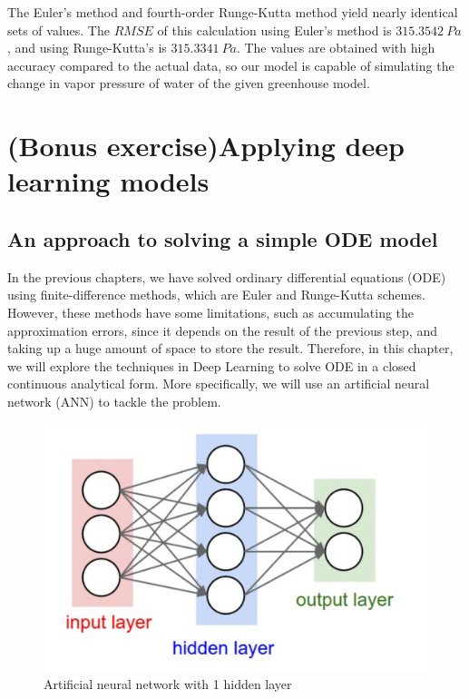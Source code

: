 \documentclass[a4paper]{article}
\numberwithin{equation}{section}
\begin{document}
The Euler's method and fourth-order Runge-Kutta method yield nearly identical sets of values. The \(RMSE\) of this calculation using Euler's method is \(315.3542\ Pa\), and using Runge-Kutta's is \(315.3341\ Pa\). The values are obtained with high accuracy compared to the actual data, so our model is capable of simulating the change in vapor pressure of water of the given greenhouse model.

\newpage
\section{(Bonus exercise)Applying deep learning models}
\subsection{An approach to solving a simple ODE model}
In the previous chapters, we have solved ordinary differential equations (ODE) using finite-difference methods, which are Euler and Runge-Kutta schemes. However, these methods have some limitations, such as accumulating the approximation errors, since it depends on the result of the previous step, and taking up a huge amount of space to store the result. Therefore, in this chapter, we will explore the techniques in Deep Learning to solve ODE in a closed continuous analytical form. More specifically, we will use an artificial neural network (ANN) to tackle the problem.

\begin{figure}[H]
  \centering
  \includegraphics[width=\textwidth]{nn.png}
  \caption{Artificial neural network with 1 hidden layer}\label{fig:nn.png}
\end{figure}
\end{document}
